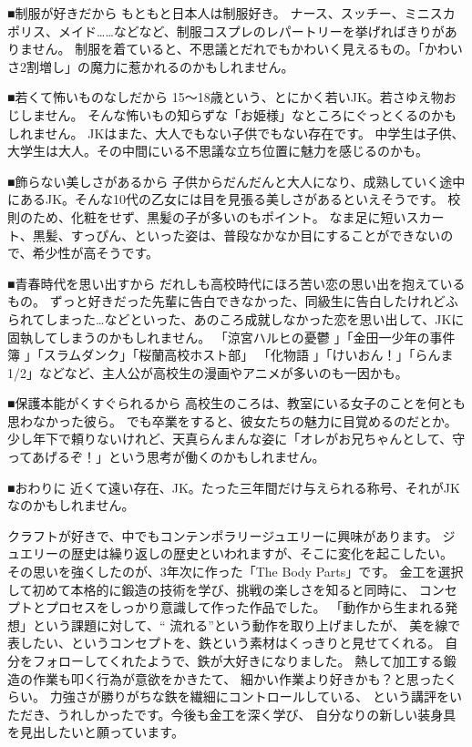■制服が好きだから
もともと日本人は制服好き。
ナース、スッチー、ミニスカポリス、メイド……などなど、制服コスプレのレパートリーを挙げればきりがありません。
制服を着ていると、不思議とだれでもかわいく見えるもの。「かわいさ2割増し」の魔力に惹かれるのかもしれません。

■若くて怖いものなしだから
15～18歳という、とにかく若いJK。若さゆえ物おじしません。
そんな怖いもの知らずな「お姫様」なところにぐっとくるのかもしれません。
JKはまた、大人でもない子供でもない存在です。
中学生は子供、大学生は大人。その中間にいる不思議な立ち位置に魅力を感じるのかも。

■飾らない美しさがあるから
子供からだんだんと大人になり、成熟していく途中にあるJK。そんな10代の乙女には目を見張る美しさがあるといえそうです。
校則のため、化粧をせず、黒髪の子が多いのもポイント。
なま足に短いスカート、黒髪、すっぴん、といった姿は、普段なかなか目にすることができないので、希少性が高そうです。

■青春時代を思い出すから
だれしも高校時代にほろ苦い恋の思い出を抱えているもの。
ずっと好きだった先輩に告白できなかった、同級生に告白したけれどふられてしまった…などといった、あのころ成就しなかった恋を思い出して、JKに固執してしまうのかもしれません。
「涼宮ハルヒの憂鬱 」「金田一少年の事件簿 」「スラムダンク」「桜蘭高校ホスト部」 「化物語 」「けいおん！」「らんま1/2」などなど、主人公が高校生の漫画やアニメが多いのも一因かも。

■保護本能がくすぐられるから
高校生のころは、教室にいる女子のことを何とも思わなかった彼ら。
でも卒業をすると、彼女たちの魅力に目覚めるのだとか。
少し年下で頼りないけれど、天真らんまんな姿に「オレがお兄ちゃんとして、守ってあげるぞ！」という思考が働くのかもしれません。

■おわりに
近くて遠い存在、JK。たった三年間だけ与えられる称号、それがJKなのかもしれません。



クラフトが好きで、中でもコンテンポラリージュエリーに興味があります。
ジュエリーの歴史は繰り返しの歴史といわれますが、そこに変化を起こしたい。
その思いを強くしたのが、3年次に作った「The Body Parts」です。
金工を選択して初めて本格的に鍛造の技術を学び、挑戦の楽しさを知ると同時に、
コンセプトとプロセスをしっかり意識して作った作品でした。
「動作から生まれる発想」という課題に対して、“ 流れる”という動作を取り上げましたが、
美を線で表したい、というコンセプトを、鉄という素材はくっきりと見せてくれる。
自分をフォローしてくれたようで、鉄が大好きになりました。
熱して加工する鍛造の作業も叩く行為が意欲をかきたて、
細かい作業より好きかも？と思ったくらい。
力強さが勝りがちな鉄を繊細にコントロールしている、
という講評をいただき、うれしかったです。今後も金工を深く学び、
自分なりの新しい装身具を見出したいと願っています。

